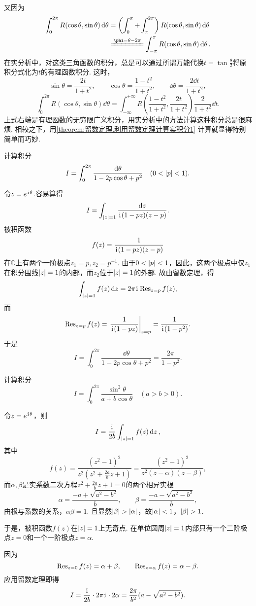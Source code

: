 又因为\begin{align*}
\int_0^{2\pi} R(\cos\theta,\sin\theta) \dd{\theta}
&= \left( \int_0^{\pi} + \int_{\pi}^{2\pi} \right) R(\cos\theta,\sin\theta) \dd{\theta} \\
&\xlongequal{\phi=\theta-2\pi} \int_{-\pi}^{\pi} R(\cos\theta,\sin\theta) \dd{\theta}.
\end{align*}
在实分析中，对这类三角函数的积分，总是可以通过所谓万能代换\(t = \tan\frac{\theta}{2}\)将原积分式化为\(t\)的有理函数积分.
这时，\[
\sin\theta = \frac{2t}{1+t^2},
\qquad
\cos\theta = \frac{1-t^2}{1+t^2},
\qquad
\dd{\theta} = \frac{2 \dd{t}}{1+t^2},
\]\[
\int_0^{2\pi} R(\cos\theta,\sin\theta) \dd{\theta}
= \int_{-\infty}^{+\infty} R\left(\frac{1-t^2}{1+t^2},\frac{2t}{1+t^2}\right) \frac{2}{1+t^2} \dd{t}.
\]上式右端是有理函数的无穷限广义积分，用实分析中的方法计算这种积分总是很麻烦.
相较之下，用\cref{theorem:留数定理.利用留数定理计算实积分1} 计算就显得特别简单而巧妙.

\begin{example}[泊松积分]\label{example:留数定理.泊松积分}
计算积分\[
I = \int_0^{2\pi} \frac{\dd{\theta}}{1-2p\cos\theta+p^2} \quad(0<\abs{p}<1).
\]
\begin{solution}
令\(z=e^{\kern1pt\mathrm{i}\kern1pt\theta}\).容易算得\[
I = \int_{\abs{z}=1} \frac{\dd{z}}{\kern1pt\mathrm{i}\kern1pt(1-pz)(z-p)}.
\]被积函数\[
f(z) = \frac{1}{\kern1pt\mathrm{i}\kern1pt(1-pz)(z-p)}
\]在\(\mathbb{C}\)上有两个一阶极点\(z_1=p, z_2=p^{-1}\).
由于\(0<\abs{p}<1\)，因此，这两个极点中仅\(z_1\)在积分围线\(\abs{z}=1\)的内部，而\(z_2\)位于\(\abs{z}=1\)的外部.
故由留数定理，得\[
\int_{\abs{z}=1} f(z) \dd{z}
= 2\pi\kern1pt\mathrm{i}\kern1pt \operatorname{Res}_{z=p} f(z),
\]而\[
\Res_{z=p} f(z)
= \eval{ \frac{1}{\iu(1-pz)} }_{z=p}
= \frac{1}{\iu(1-p^2)}.
\]于是\[
I = \int_0^{2\pi} \frac{\dd{\theta}}{1-2p\cos\theta+p^2}
= \frac{2\pi}{1-p^2}.
\]
\end{solution}
\end{example}

\begin{example}
计算积分\[
I = \int_0^{2\pi} \frac{\sin^2 \theta}{a+b\cos\theta} \quad(a>b>0).
\]
\begin{solution}
令\(z=e^{\kern1pt\mathrm{i}\kern1pt\theta}\)，则\[
I = \frac{\kern1pt\mathrm{i}\kern1pt}{2b} \int_{\abs{z}=1} f(z) \dd{z},
\]其中\[
f(z) = \frac{(z^2-1)^2}{z^2 \left(z^2+\frac{2a}{b}z+1\right)}
= \frac{(z^2-1)^2}{z^2(z-\alpha)(z-\beta)},
\]而\(\alpha,\beta\)是实系数二次方程\(z^2+\frac{2a}{b}z+1=0\)的两个相异实根\[
\alpha=\frac{-a+\sqrt{a^2-b^2}}{b},
\qquad
\beta=\frac{-a-\sqrt{a^2-b^2}}{b},
\]由根与系数的关系，\(\alpha\beta=1\).
且显然\(\abs{\beta}>\abs{\alpha}\)，故\(\abs{\alpha}<1\)，\(\abs{\beta}>1\).

于是，被积函数\(f(z)\)在\(\abs{z}=1\)上无奇点.
在单位圆周\(\abs{z}=1\)内部只有一个二阶极点\(z=0\)和一个一阶极点\(z=\alpha\).

因为\[
\operatorname{Res}_{z=0} f(z) = \alpha+\beta,
\qquad
\operatorname{Res}_{z=\alpha} f(z) = \alpha-\beta.
\]应用留数定理即得\[
I = \frac{\kern1pt\mathrm{i}\kern1pt}{2b} \cdot 2\pi\kern1pt\mathrm{i}\kern1pt \cdot 2\alpha
= \frac{2\pi}{b^2} (a-\sqrt{a^2-b^2}).
\]
\end{solution}
\end{example}

